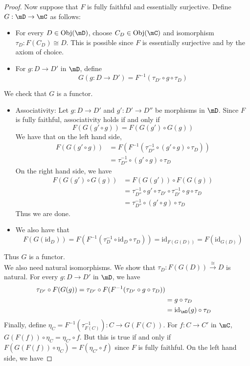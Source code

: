 \documentclass[a4paper]{article}
\begin{document}
\begin{prp}{}{}
\begin{proof}
Now suppose that $F$ is fully faithful and essentially surjective. Define $G:\mD\to\mC$ as follows: 
\begin{itemize}
\item For every $D\in\text{Obj}(\mD)$, choose $C_D\in\text{Obj}(\mC)$ and isomorphism $\tau_D:F(C_D)\cong D$. This is possible since $F$ is essentially surjective and by the axiom of choice. 
\item For $g:D\to D'$ in $\mD$, define $$G(g:D\to D')=F^{-1}(\tau_{D'}\circ g\circ\tau_D)$$
\end{itemize}
We check that $G$ is a functor. 
\begin{itemize}
\item Associativity: Let $g:D\to D'$ and $g':D'\to D''$ be morphisms in $\mD$. Since $F$ is fully faithful, associativity holds if and only if $$F(G(g'\circ g))=F(G(g')\circ G(g))$$ We have that on the left hand side, 
\begin{align*}
F(G(g'\circ g))&=F(F^{-1}(\tau_{D''}^{-1}\circ(g'\circ g)\circ\tau_D))\\
&=\tau_{D''}^{-1}\circ(g'\circ g)\circ\tau_D
\end{align*}
On the right hand side, we have 
\begin{align*}
F(G(g')\circ G(g))&=F(G(g'))\circ F(G(g))\\
&=\tau_{D''}^{-1}\circ g'\circ\tau_{D'}\circ\tau_{D'}^{-1}\circ g\circ\tau_D\\
&=\tau_{D''}^{-1}\circ(g'\circ g)\circ\tau_D
\end{align*}
Thus we are done. 
\item We also have that $$F(G(\text{id}_D))=F(F^{-1}(\tau_D^{-1}\circ\text{id}_D\circ\tau_D))=\text{id}_{F(G(D))}=F(\text{id}_{G(D)})$$
\end{itemize}
Thus $G$ is a functor. \\
We also need natural isomorphisms. We show that $\tau_D:F(G(D))\overset{\cong}{\rightarrow}D$ is natural. For every $g:D\to D'$ in $\mD$, we have 
\begin{align*}
\tau_{D'}\circ F(G(g))=\tau_{D'}\circ F(F^{-1}(\tau_{D'}\circ g\circ\tau_D))\\
&=g\circ\tau_D\\
&=\text{id}_{\mD}(g)\circ\tau_D
\end{align*}
Finally, define $\eta_C=F^{-1}(\tau_{F(C)}^{-1}):C\to G(F(C))$. For $f:C\to C'$ in $\mC$, $G(F(f))\circ\eta_C=\eta_{C'}\circ f$. But this is true if and only if $F(G(F(f))\circ\eta_C)=F(\eta_{C'}\circ f)$ since $F$ is fully faithful. On the left hand side, we have

\end{proof}
\end{prp}
\end{document}
